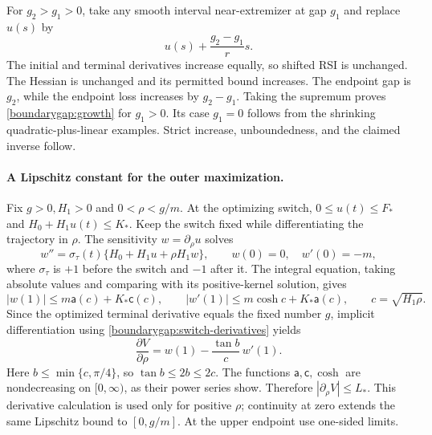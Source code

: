 For $g_2>g_1>0$, take any smooth interval near-extremizer at gap $g_1$
and replace $u(s)$ by
\[
 u(s)+\frac{g_2-g_1}{r}s.
\]
The initial and terminal derivatives increase equally, so shifted RSI
is unchanged.  The Hessian is unchanged and its permitted bound
increases.  The endpoint gap is $g_2$, while the endpoint loss
increases by $g_2-g_1$.  Taking the supremum proves
\eqref{boundarygap:growth} for $g_1>0$.  Its case $g_1=0$ follows from
the shrinking quadratic-plus-linear examples.  Strict increase,
unboundedness, and the claimed inverse follow.

\paragraph{A Lipschitz constant for the outer maximization.}
Fix $g>0,H_1>0$ and $0<\rho<g/m$.  At the optimizing switch,
$0\le u(t)\le F_*$ and $H_0+H_1u(t)\le K_*$.
Keep the switch fixed while differentiating the trajectory in $\rho$.
The sensitivity $w=\partial_\rho u$ solves
\[
 w''=\sigma_\tau(t)\{H_0+H_1u+\rho H_1w\},
 \qquad w(0)=0,\quad w'(0)=-m,
\]
where $\sigma_\tau$ is $+1$ before the switch and $-1$ after it.
The integral equation, taking absolute values and comparing with its
positive-kernel solution, gives
\[
 |w(1)|\le m\mathsf a(c)+K_*\mathsf c(c),\qquad
 |w'(1)|\le m\cosh c+K_*\mathsf a(c),\qquad c=\sqrt{H_1\rho}.
\]
Since the optimized terminal derivative equals the fixed number $g$,
implicit differentiation using \eqref{boundarygap:switch-derivatives}
yields
\begin{equation}\label{boundarygap:rho-derivative}
 \frac{\partial V}{\partial\rho}
     =w(1)-\frac{\tan b}{c}\,w'(1).
\end{equation}
Here $b\le\min\{c,\pi/4\}$, so $\tan b\le2b\le2c$.
The functions $\mathsf a,\mathsf c,\cosh$ are nondecreasing on
$[0,\infty)$, as their power series show.  Therefore
$|\partial_\rho V|\le L_*$.  This derivative calculation is used only
for positive $\rho$; continuity at zero extends the same Lipschitz
bound to $[0,g/m]$.  At the upper endpoint use one-sided limits.

